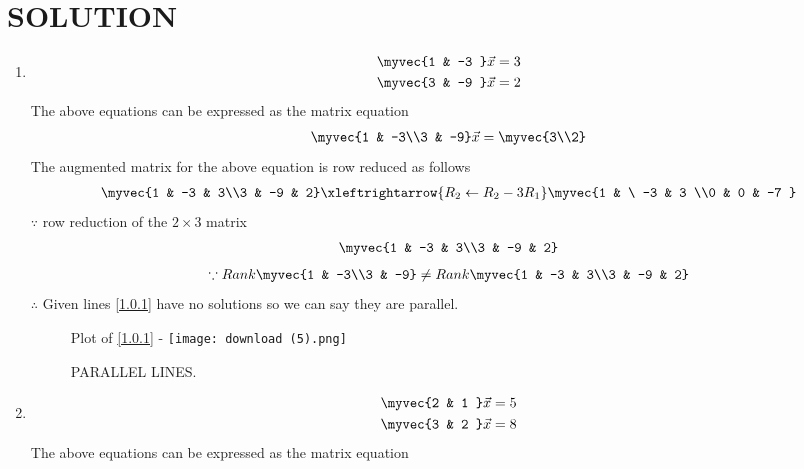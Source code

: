 \documentclass[journal,12pt,twocolumn]{IEEEtran}
\begin{document}
\section{SOLUTION}  
\begin{enumerate}
\item
\begin{align}
\begin{split}
\myvec{1 & -3 }\vec{x}&=3
\\
\myvec{3 & -9 }\vec{x}&=2
\end{split}
\end{align}
The above equations can be expressed as the matrix equation
\begin{align}
\myvec{1 & -3\\3 & -9} \vec{x} = \myvec{3\\2}
\end{align}
%
The augmented matrix for the above equation is row reduced as follows
\begin{align}
\myvec{1 & -3 & 3\\3 & -9 & 2} 
\xleftrightarrow {R_2\leftarrow R_2 -3R_1}\myvec{1 & \ -3 & 3 \\0 & 0 & -7 }
\end{align}
%
$\because$ row reduction of the $2\times 3$ matrix
%
\begin{align}
\myvec{1 & -3 & 3\\3 & -9 & 2} 
\end{align}
%
\begin{align}
\because Rank \myvec{1 & -3\\3 & -9} \ne Rank\myvec{1 & -3 & 3\\3 & -9 & 2} \nonumber\\
\end{align}
$\therefore$ Given lines \eqref{1.0.1} have no solutions so we can say they are parallel.
\begin{figure}[ht!]
Plot of \eqref{1.0.1} - 
\centering
\texttt{[image: download (5).png]}
\caption{PARALLEL LINES.}
\label{figure: parallel lines.}
\end{figure}
\item
\begin{align}
\begin{split}
\myvec{2 & 1 }\vec{x}&=5  
\\
\myvec{3 & 2 }\vec{x}&=8
\end{split}
\end{align}
The above equations can be expressed as the matrix equation
\begin{align}

\end{align}
\end{enumerate}
\end{document}
